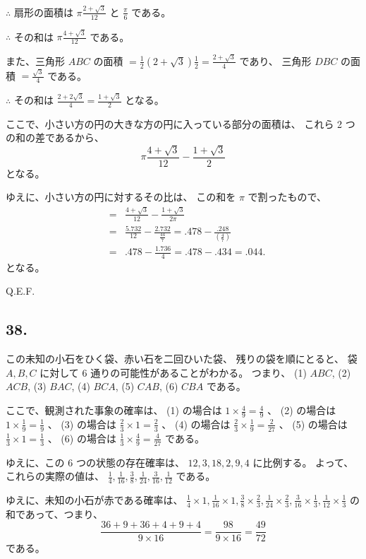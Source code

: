 $\therefore$ 扇形の面積は $\pi \frac{2 + \sqrt{3}}{12} $
と $\frac{\pi}{6}$ である。

$\therefore$ その和は $\pi \frac{4 + \sqrt{3}}{12}$ である。

また、三角形 $ABC$ の面積 $= \frac{1}{2}(2 + \sqrt{3}) \frac{1}{2}
= \frac{2 + \sqrt{3}}{4}$ であり、
三角形 $DBC$ の面積 $= \frac{\sqrt{3}}{4}$ である。

$\therefore$ その和は $\frac{2 + 2\sqrt{3}}{4} = \frac{1 + \sqrt{3}}{2}$
となる。

ここで、小さい方の円の大きな方の円に入っている部分の面積は、
これら 2 つの和の差であるから、
\[
\pi \frac{4 + \sqrt{3}}{12} - \frac{1 + \sqrt{3}}{2}
\]
となる。

ゆえに、小さい方の円に対するその比は、
この和を $\pi$ で割ったもので、
\begin{eqnarray*}
&=& \frac{4 + \sqrt{3}}{12} - \frac{1 + \sqrt{3}}{2 \pi}\\
&=& \frac{5.732}{12} - \frac{2.732}{\frac{44}{7}}
 = .478 - \frac{.248}{\left( \frac{4}{7} \right)}\\
&=& .478 - \frac{1.736}{4}
 = .478 - .434 = .044.
\end{eqnarray*}
となる。

Q.E.F.


\subsection*{38.}

この未知の小石をひく袋、赤い石を二回ひいた袋、
残りの袋を順にとると、
袋 $A, B, C$ に対して 6 通りの可能性があることがわかる。
つまり、
(1) $ABC$, (2) $ACB$, (3) $BAC$, (4) $BCA$, (5) $CAB$, (6) $CBA$
である。

ここで、観測された事象の確率は、
(1) の場合は $1 \times \frac{4}{9} = \frac{4}{9}$ 、
(2) の場合は $1 \times \frac{1}{9} = \frac{1}{9}$ 、
(3) の場合は $\frac{2}{3} \times 1 = \frac{2}{3}$ 、
(4) の場合は $\frac{2}{3} \times \frac{1}{9} = \frac{2}{27}$ 、
(5) の場合は $\frac{1}{3} \times 1 = \frac{1}{3}$ 、
(6) の場合は $\frac{1}{3} \times \frac{4}{9} = \frac{4}{27}$
である。

ゆえに、この $6$ つの状態の存在確率は、
$12, 3, 18, 2, 9, 4$ に比例する。
よって、これらの実際の値は、
$\frac{1}{4},\frac{1}{16},\frac{3}{8},\frac{1}{24},\frac{3}{16},\frac{1}{12}$
である。

ゆえに、未知の小石が赤である確率は、
$\frac{1}{4} \times 1, \frac{1}{16} \times 1, 
\frac{3}{8} \times \frac{2}{3},
\frac{1}{24} \times \frac{2}{3},
\frac{3}{16} \times \frac{1}{3},
\frac{1}{12} \times \frac{1}{3}$
の和であって、つまり、
\[
\frac{36 + 9 + 36 + 4 + 9 + 4}{9 \times 16}
= \frac{98}{9 \times 16} = \frac{49}{72}
\]
である。

